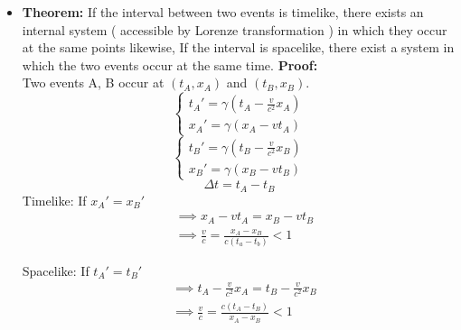 \documentclass[fleqn,a4paper,12pt]{article}
\begin{document}
\begin{itemize}
\begin{itemize}
        \item 
          \textbf{Theorem:} If the interval between two events is timelike, there exists an internal system ( accessible by Lorenze transformation ) in which they occur at the same points likewise, If the interval is spacelike, there exist a system in which the two events occur at the same time.
          \textbf{Proof:} \\
          Two events A, B occur at $(t_A,x_A)$ and $(t_B,x_B)$.
          \[ 
            \begin{cases}
              t_A' = \gamma( t_A-\frac{v}{c^2}x_A )\\
              x_A' = \gamma( x_A - vt_A )
            \end{cases}
          \]
          \[ 
            \begin{cases}
              t_B' = \gamma( t_B-\frac{v}{c^2}x_B )\\
              x_B' = \gamma( x_B - vt_B )
            \end{cases}
          \]
          \[
            \Delta t = t_A -t_B
          \]
          Timelike: If $x_A' = x_B'$
          \begin{align*}            
            &\implies x_A - vt_A = x_B - vt_B \\
            &\implies \frac{v}{c} = \frac { x_A - x_B }{ c( t_a - t_b ) }  < 1 
          \end{align*}

          Spacelike: If $t_A' = t_B'$
          \begin{align*}            
            &\implies t_A - \frac{v}{c^2}x_A = t_B - \frac{v}{c^2}x_B \\
            &\implies \frac{v}{c} = \frac {c( t_A - t_B )}{ x_A - x_B } < 1 \\                          
          \end{align*}
          

            


    \end{itemize}

\end{itemize}
\end{document}
